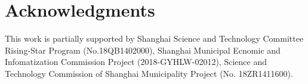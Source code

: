 
\section*{Acknowledgments}
This work is partially supported by Shanghai Science and Technology Committee Rising-Star Program (No.18QB1402000), Shanghai Municipal Ecnomic and Infomatization Commission Project (2018-GYHLW-02012), Science and Technology Commission of Shanghai Municipality Project (No. 18ZR1411600).


